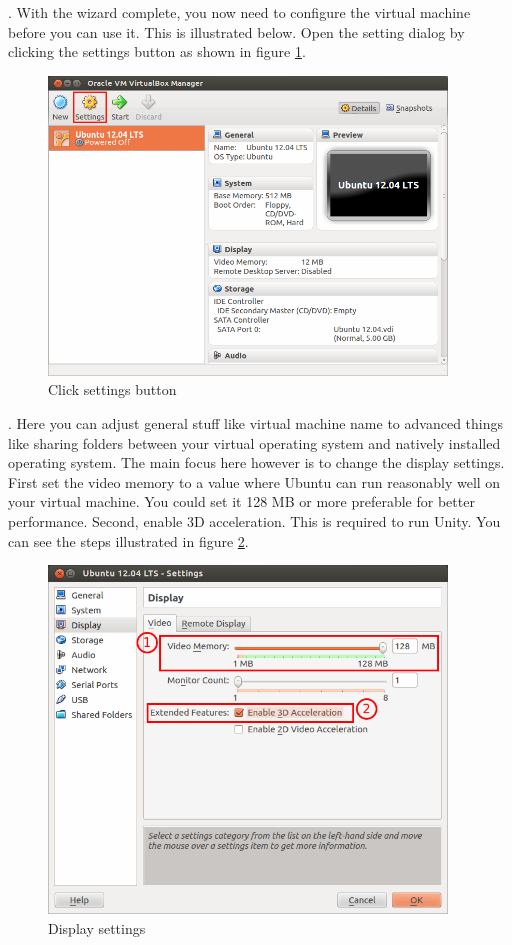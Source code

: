 \newpage
\par {}. With the wizard complete, you now need to configure the virtual machine before you can use it. This is illustrated below. Open the setting dialog by clicking the settings button as shown in figure \ref{fig:wizard-final}. \\

\begin{figure}[!h]	
	\centering
	\includegraphics[width=300pt]{./images/installation/virtualbox/wizard-final.png}
	\caption{Click settings button}	
	\label{fig:wizard-final}	
\end{figure}

\par {}. Here you can adjust general stuff like virtual machine name to advanced things like sharing folders between your virtual operating system and natively installed operating system. The main focus here however is to change the display settings. First set the video memory to a value where Ubuntu can run reasonably well on your virtual machine. You could set it 128 MB or more preferable for better performance. Second, enable 3D acceleration. This is required to run Unity. You can see the steps illustrated in figure \ref{fig:settings-display}. \\

\begin{figure}[!h]	
	\centering
	\includegraphics[width=300pt]{./images/installation/virtualbox/settings-display.png}
	\caption{Display settings}	
	\label{fig:settings-display}	
\end{figure}

